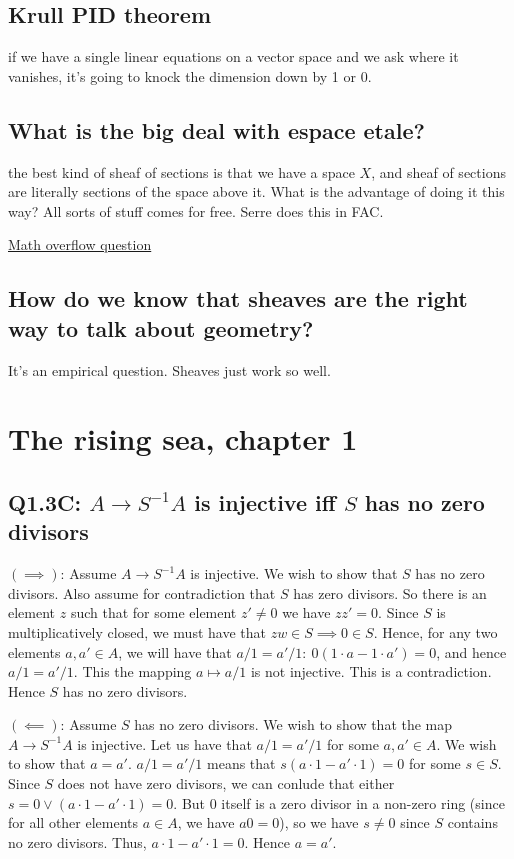 \documentclass{book}
\theoremstyle{definition}
\begin{document}
\section{Krull PID theorem}
if we have a single linear equations on a vector space and we ask where it vanishes,
it's going to knock the dimension down by 1 or 0. 

\section{What is the big deal with espace etale?}
the best kind of sheaf of sections is that we have a space $X$, and sheaf of sections
are literally sections of the space above it. What is the advantage of doing it
this way? All sorts of stuff comes for free. Serre does this in FAC.

\href{https://mathoverflow.net/questions/96264/what-are-the-benefits-of-viewing-a-sheaf-from-the-espace-%C3%A9tal%C3%A9-perspective}{Math overflow question}

\section{How do we know that sheaves are the right way to talk about geometry?}
It's an empirical question. Sheaves just work so well.

\chapter{The rising sea, chapter 1}
\section{Q1.3C: $A \rightarrow S^{-1}A$ is injective iff $S$ has no zero divisors}
$(\implies)$: 
Assume $A \rightarrow S^{-1}A$ is injective. We wish to show that $S$ has no 
zero divisors. Also assume for contradiction that
$S$ has zero divisors. So there is an element $z$ such that for some
element $z' \neq 0$ we have $zz' = 0$.
Since $S$ is multiplicatively closed, we must have that $zw \in S \implies 0 \in S$.
Hence, for any two elements $a, a' \in A$, we will have that $a/1 = a'/1: ~ 0(1\cdot a - 1\cdot a') = 0$,
and hence $a/1 = a'/1$. This the mapping  $a \mapsto a/1$ is not injective. This
is a contradiction. Hence $S$ has no zero divisors.

$(\impliedby)$:
Assume $S$ has no zero divisors. We wish to show that the map $A \rightarrow S^{-1}A$
is injective. Let us have that $a/1 = a'/1$ for some $a, a' \in A$. We wish to show
that $a = a'$. $a/1 = a'/1$ means that $s(a\cdot 1 - a' \cdot 1) = 0$  for some $s \in S$.
Since $S$ does not have zero divisors, we can conlude that either $s = 0 \lor (a\cdot 1 - a' \cdot 1) = 0$.
But $0$ itself is a zero divisor in a non-zero ring (since for all other elements $a \in A$, we have $a0 = 0$),
so we have $s \neq 0$ since $S$ contains no zero divisors. Thus, $a \cdot 1 - a' \cdot 1 = 0$.
Hence $a = a'$.
\end{document}
